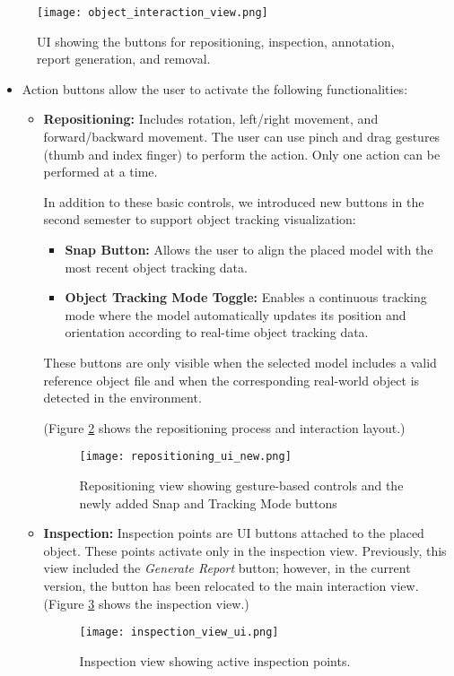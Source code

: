 \begin{figure}[H]
    \centering
    \texttt{[image: object\_interaction\_view.png]}
    \caption{\centering UI showing the buttons for repositioning, inspection, annotation, report generation, and removal.}
    \label{fig:object_interaction_view}
\end{figure}


\begin{itemize}
    \item Action buttons allow the user to activate the following functionalities:
    \begin{itemize}

        \item \textbf{Repositioning:} Includes rotation, left/right movement, and forward/backward movement. The user can use pinch and drag gestures (thumb and index finger) to perform the action. Only one action can be performed at a time.

        In addition to these basic controls, we introduced new buttons in the second semester to support object tracking visualization:
        \begin{itemize}
            \item \textbf{Snap Button:} Allows the user to align the placed model with the most recent object tracking data.
            \item \textbf{Object Tracking Mode Toggle:} Enables a continuous tracking mode where the model automatically updates its position and orientation according to real-time object tracking data.
        \end{itemize}

        These buttons are only visible when the selected model includes a valid reference object file and when the corresponding real-world object is detected in the environment.

        (Figure \ref{fig:ui_repositioning} shows the repositioning process and interaction layout.)
        \begin{figure}[H]
            \centering
            \texttt{[image: repositioning\_ui\_new.png]}
            \caption{\centering Repositioning view showing gesture-based controls and the newly added Snap and Tracking Mode buttons}
            \label{fig:ui_repositioning}
        \end{figure}


        \item \textbf{Inspection:} Inspection points are UI buttons attached to the placed object. These points activate only in the inspection view. Previously, this view included the \textit{Generate Report} button; however, in the current version, the button has been relocated to the main interaction view. (Figure \ref{fig:ui_inspection_view} shows the inspection view.)
        \begin{figure}[H]
            \centering
            \texttt{[image: inspection\_view\_ui.png]}
            \caption{Inspection view showing active inspection points.}
            \label{fig:ui_inspection_view}
        \end{figure}


\end{itemize}
\end{itemize}
